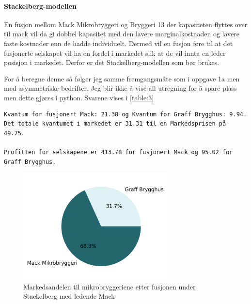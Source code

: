 \documentclass[
  12pt,
  a4paper,
  DIV=11,
  numbers=noendperiod]{scrartcl}
\let\oldparagraph\paragraph
\renewcommand{\paragraph}[1]{\oldparagraph{#1}\mbox{}}
\begin{document}
\paragraph{Stackelberg-modellen}\label{stackelberg-modellen}

En fusjon mellom Mack Mikrobryggeri og Bryggeri 13 der kapasiteten
flyttes over til mack vil da gi dobbel kapasitet med den lavere
marginalkostnaden og lavere faste kostnader enn de hadde individuelt.
Dermed vil en fusjon føre til at det fusjonerte selskapet vil ha en
fordel i markedet slik at de vil innta en leder posisjon i markedet.
Derfor er det Stackelberg-modellen som bør brukes.

For å beregne denne så følger jeg samme fremgangsmåte som i oppgave 1a
men med asymmetriske bedrifter. Jeg blir ikke å vise all utregning for å
spare plass men dette gjøres i python. Svarene vises i \autoref{table:3}

\begin{verbatim}
Kvantum for fusjonert Mack: 21.38 og Kvantum for Graff Brygghus: 9.94. 
Det totale kvantumet i markedet er 31.31 til en Markedsprisen på 49.75.

Profitten for selskapene er 413.78 for fusjonert Mack og 95.02 for Graff Brygghus.
\end{verbatim}

\begin{figure}[!h]
\centering
\includegraphics[width=0.7\textwidth]{dokumentobjekter/figurer/markedsandel_mikrobryggerier_fusjon_stackel.png}
\caption{Markedsandelen til mikrobryggeriene etter fusjonen under Stackelberg med ledende Mack}
\label{fig:markedsandel_etter_stackel}
\end{figure}

\clearpage
\end{document}

